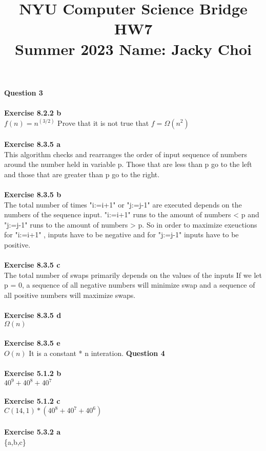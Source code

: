 \documentclass{article}
\title{\textbf{NYU Computer Science Bridge HW7}\\
Summer 2023 Name: Jacky Choi}
\date{}
\begin{document}
\setul{}{2pt}
\maketitle

\noindent \textbf{Question 3}\\\\
\textbf{Exercise 8.2.2 b}\\
$f(n) = n^{(3/2)}$ Prove that it is not true that $f = \Omega(n^2)$\\\\
\textbf{Exercise 8.3.5 a}\\
This algorithm checks and rearranges the order of input sequence of numbers around the number held in variable p. Those that are less than p go to the left and those that are greater than p go to the right. \\\\
\textbf{Exercise 8.3.5 b}\\
The total number of times "i:=i+1" or "j:=j-1" are executed depends on the numbers of the sequence input. "i:=i+1" runs to the amount of numbers < p and "j:=j-1" runs to the amount of numbers > p. So in order to maximize exeuctions for "i:=i+1" , inputs have to be negative and for "j:=j-1" inputs have to be positive.\\\\
\textbf{Exercise 8.3.5 c}\\
The total number of swaps primarily depends on the values of the inputs  If we let p = 0, a sequence of all negative numbers will minimize swap and a sequence of all positive numbers will maximize swaps.\\\\
\textbf{Exercise 8.3.5 d}\\
$\Omega(n)$\\\\
\textbf{Exercise 8.3.5 e}\\
$O(n)$ It is a constant * n interation.
\newpage
\noindent \textbf{Question 4}\\\\
\textbf{Exercise 5.1.2 b}\\
$40^9 + 40^8 + 40^7$\\\\
\textbf{Exercise 5.1.2 c}\\
$C(14,1) * (40^8 + 40^7 + 40^6)$\\\\
\textbf{Exercise 5.3.2 a}\\
\{a,b,c\}\\
\end{document}
